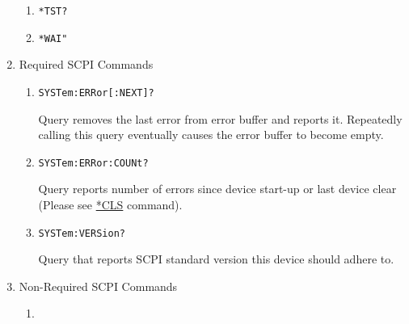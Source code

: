 \documentclass[a4paper,10pt]{article}
\begin{document}
\begin{enumerate}
\begin{enumerate}
        \item \begin{verbatim}*TST?\end{verbatim}
        \item \begin{verbatim}*WAI"\end{verbatim}
    \end{enumerate}
\item Required SCPI Commands
    \begin{enumerate}
        \item 
            \begin{verbatim}SYSTem:ERRor[:NEXT]?\end{verbatim}
            \begin{description}
                Query removes the last error from error buffer and reports it. Repeatedly calling this query eventually causes the error buffer to become empty.
            \end{description}
        \item 
            \begin{verbatim}SYSTem:ERRor:COUNt?\end{verbatim}
            \begin{description}
                Query reports number of errors since device start-up or last device clear (Please see \hyperlink{cls}{*CLS} command).
            \end{description}
        \item 
            \begin{verbatim}SYSTem:VERSion?\end{verbatim}
            \begin{description}
                Query that reports SCPI standard version this device should adhere to.
            \end{description}
    \end{enumerate}
\item Non-Required SCPI Commands
    \begin{enumerate}
        \item

\end{enumerate}
\end{enumerate}
\end{document}
